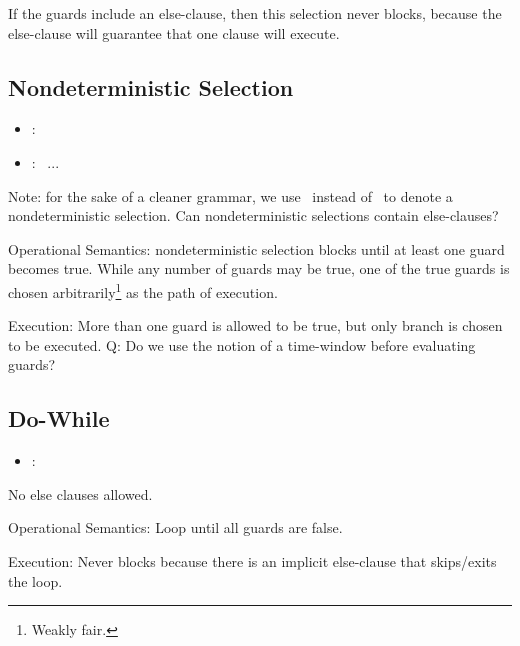 If the guards include an else-clause, then this selection never blocks, 
because the else-clause will guarantee that one clause will execute.  

\subsection{Nondeterministic Selection}
\label{sec:chp:flow:nondetsel}

\begin{itemize}
\item {} :
	\lbracket\  \rbracket
\item {} :
	 \thinbar\ ...
\end{itemize}

Note: for the sake of a cleaner grammar, 
we use \thinbar\ instead of \oldthinbar\ to denote 
a nondeterministic selection.  
Can nondeterministic selections contain else-clauses?

Operational Semantics: nondeterministic selection blocks until at least
one guard becomes true.  
While any number of guards may be true, one of the true guards is 
chosen arbitrarily\footnote{Weakly fair.} as the path of execution.  

Execution:
More than one guard is allowed to be true, but only branch is chosen
to be executed.  
Q: Do we use the notion of a time-window before evaluating guards?

\subsection{Do-While}
\label{sec:chp:flow:dowhile}

\begin{itemize}
\item {} :
	\chpbeginloop\  \chpendloop
\end{itemize}

No else clauses allowed.  

Operational Semantics:
Loop until all guards are false.  

Execution:
Never blocks because there is an implicit else-clause that
skips/exits the loop.  

